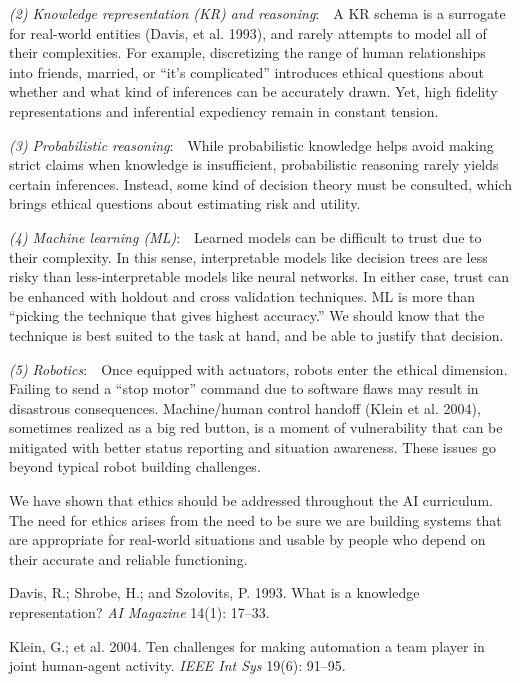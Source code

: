 \documentclass[letterpaper]{article}
\begin{document}
{\em (2) Knowledge representation (KR) and reasoning}:~~A KR schema is a surrogate for real-world entities (Davis, et al. 1993), and rarely attempts to model all of their complexities. For example, discretizing the range of human relationships into friends, married, or ``it's complicated'' introduces ethical questions about whether and what kind of inferences can be accurately drawn. Yet, high fidelity representations and inferential expediency remain in constant tension.

{\em (3) Probabilistic reasoning}:~~While probabilistic knowledge helps avoid making strict claims when knowledge is insufficient, probabilistic reasoning rarely yields certain inferences. Instead, some kind of decision theory must be consulted, which brings ethical questions about estimating risk and utility.

{\em (4) Machine learning (ML)}:~~Learned models can be difficult to trust due to their complexity. In this sense, interpretable models like decision trees are less risky than less-interpretable models like neural networks. In either case, trust can be enhanced with holdout and cross validation techniques. ML is more than ``picking the technique that gives highest accuracy.'' We should know that the technique is best suited to the task at hand, and be able to justify that decision.

{\em (5) Robotics}:~~Once equipped with actuators, robots enter the ethical dimension. Failing to send a ``stop motor'' command due to software flaws may result in disastrous consequences. Machine/human control handoff (Klein et al. 2004), sometimes realized as a big red button, is a moment of vulnerability that can be mitigated with better status reporting and situation awareness. These issues go beyond typical robot building challenges.

We have shown that ethics should be addressed throughout the AI curriculum. The need for ethics arises from the need to be sure we are building systems that are appropriate for real-world situations and usable by people who depend on their accurate and reliable functioning.\\[-0.75em]

{\footnotesize 
{}

\noindent Davis, R.; Shrobe, H.; and Szolovits, P. 1993. What is a knowledge representation? {\em AI Magazine} 14(1): 17--33.\vspace{0.25em}

\noindent Klein, G.; et al. 2004. Ten challenges for making automation a team player in joint human-agent activity. {\em IEEE Int Sys} 19(6): 91--95.
}
\end{document}
